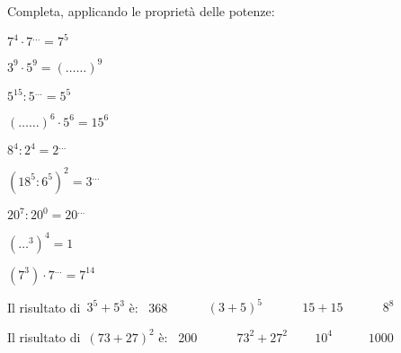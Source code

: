 \begin{esercizio}
 Completa, applicando le proprietà delle potenze:
\begin{htmulticols}{3}
 \begin{enumeratees}
 \item \(7^4\cdot7^{\ldots}=7^5\)
 \item \(3^9\cdot5^9=(\ldots\ldots)^9\)
 \item \(5^{15}:5^{\ldots}=5^5\)
 \item \((\ldots\ldots)^6\cdot5^6=15^6\)
 \item \(8^4:2^4=2^{\ldots}\)
 \item \((18^5:6^5)^2=3^{\ldots}\)
 \item \(20^7:20^0=20^{\ldots}\)
 \item \((\ldots^3)^4=1\)
 \item \((7^3) \cdot 7^{\ldots}=7^{14}\)
 \end{enumeratees}
\end{htmulticols}
\end{esercizio}

\begin{esercizio}
 Il risultato di~\(3^5+5^3\) è: \hfill
 ~368 ~~~~ ~\((3+5)^5\) ~~~~ 
~\(15+15\) ~~~~ ~\(8^8\)
 \end{esercizio}

\begin{esercizio}
 Il risultato di~\((73+27)^2\) è: \hfill
 ~200 ~~~~ ~\(73^2+27^2\) 
~~ ~\(10^4\) ~~~~~\(1000\)
\end{esercizio}


\subsubsection*{}

